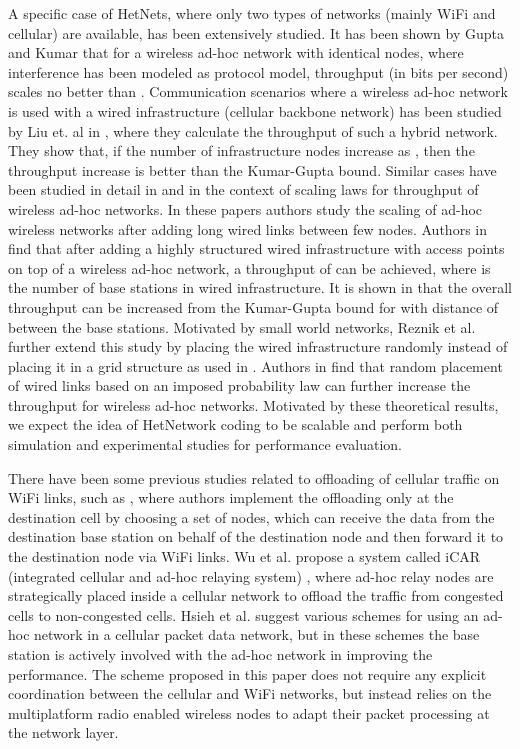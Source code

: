 \documentclass{sig-alternate-10pt}
\begin{document}
A specific case of HetNets, where only two types of networks (mainly WiFi and cellular) are available, has been extensively studied. It has been shown by Gupta and Kumar \cite{Gupta00thecapacity} that for a wireless ad-hoc network with  identical nodes, where interference has been modeled as protocol model, throughput (in bits per second) scales no better than . Communication scenarios where a wireless ad-hoc network is used with a wired infrastructure (cellular backbone network) has been studied by Liu et. al in  \cite{towsley03capacity}, where they calculate the throughput of such a hybrid network. They show that, if the number of infrastructure nodes increase as , then the throughput increase is better than the Kumar-Gupta bound. Similar cases  have been studied in detail in  \cite{Kulkarni03throughputscaling} and \cite{Reznik04asmall} in the context of scaling laws for   throughput of  wireless ad-hoc networks. In these papers authors study the scaling of ad-hoc wireless networks after adding long wired links between few nodes.  Authors in \cite{Kulkarni03throughputscaling} find that after adding a highly structured wired infrastructure with access points  on top of a wireless ad-hoc network, a  throughput of  can be achieved, where  is the number of base stations in wired infrastructure. It is shown in \cite{Kulkarni03throughputscaling} that the overall throughput can be increased from the Kumar-Gupta bound  for  with distance of  between the base stations. Motivated by small world networks, Reznik et al. \cite{Reznik04asmall} further extend this study by placing the wired infrastructure randomly instead of placing it in a grid structure as used in \cite{Kulkarni03throughputscaling}.  Authors in \cite{Reznik04asmall} find that random placement of wired links based on an imposed probability law can further increase the throughput for wireless ad-hoc networks. Motivated by these theoretical results, we expect the idea of HetNetwork coding to be scalable and perform both simulation and experimental studies for performance evaluation.


There have been some previous studies related to offloading of cellular traffic on WiFi links, such as  \cite{dhh11}, \cite{lmrs07} where authors implement the offloading only at the destination cell by choosing a set of nodes, which can receive the data from the destination base station on behalf of the destination node and then forward it to the destination node via WiFi links. Wu et al. propose a system called iCAR (integrated cellular and ad-hoc relaying system) \cite{Wu01integratedcellular}, where ad-hoc relay nodes are strategically placed inside a cellular network to offload the traffic from congested cells to non-congested cells.  Hsieh et al. \cite{Hsieh:2002:UAN:513800.513805} suggest various schemes for using an ad-hoc network in a cellular packet data network, but in these schemes the base station is actively involved with the ad-hoc network in improving the performance. The scheme proposed in this paper does not require any explicit coordination between the cellular and WiFi networks, but instead relies on the multiplatform radio enabled wireless nodes to adapt their packet processing at the network layer.
\end{document}

